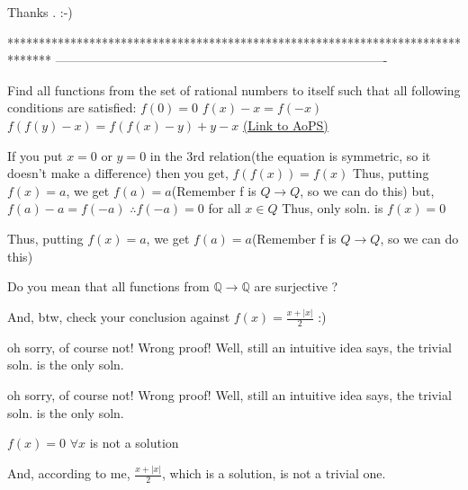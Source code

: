 \begin{solution}
	Thanks . :-)
\end{solution}
*******************************************************************************
-------------------------------------------------------------------------------

\begin{problem}
	Find all functions from the set of rational numbers to itself such that all following conditions are satisfied:
$f(0)=0$
$f(x)-x=f(-x)$
$f(f(y)-x)=f(f(x)-y)+y-x$
	\flushright \href{https://artofproblemsolving.com/community/c6h469887}{(Link to AoPS)}
\end{problem}



\begin{solution}
	If you put $x=0$ or $y=0$ in the 3rd relation(the equation is symmetric, so it doesn't make a difference) then you get, $f(f(x))=f(x)$
Thus, putting $f(x)=a$, we get $f(a)=a$(Remember f is $Q\to Q$, so we can do this)
but, $f(a)-a=f(-a)$
$\therefore f(-a)=0$ for all $x\in Q$
Thus, only soln. is $\boxed{f(x)=0}$
\end{solution}



\begin{solution}
	\begin{tcolorbox}
Thus, putting $f(x)=a$, we get $f(a)=a$(Remember f is $Q\to Q$, so we can do this)
\end{tcolorbox}

Do you mean that all functions from $\mathbb Q\to\mathbb Q$ are surjective ?

And, btw, check your conclusion against $f(x)=\frac{x+|x|}2$ :)
\end{solution}



\begin{solution}
	oh sorry, of course not!
Wrong proof!
Well, still an intuitive idea says, the trivial soln. is the only soln.
\end{solution}



\begin{solution}
	\begin{tcolorbox}oh sorry, of course not!
Wrong proof!
Well, still an intuitive idea says, the trivial soln. is the only soln.\end{tcolorbox}
$f(x)=0$ $\forall x$ is not a solution

And, according to me, $\frac{x+|x|}2$, which is a solution, is not a trivial one.
\end{solution}



